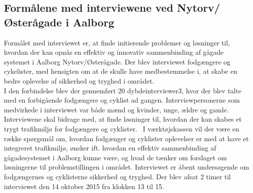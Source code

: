 \subsection{Formålene med interviewene ved Nytorv/Østerågade i Aalborg}
Formålet med interviewet er, at finde initierende problemer og løsninger til, hvordan der kan opnås en effektiv og innovativ sammenbinding af gågade systemet i Aalborg Nytorv/Østerågade. Der blev interviewet fodgængere og cykelister, med hensigten om at de skulle have medbestemmelse i, at skabe en bedre oplevelse af sikkerhed og tryghed i området.
\\
I den forbindelse blev der gennemført 20 dybdeinterviewer3, hvor der blev talte med en forbigående fodgængere og cyklist ad gangen. Interviewpersonerne som medvirkede i interviewet var både mænd og kvinder, unge, ældre og gamle. Interviewene skal bidrage med, at finde løsninger til, hvordan der kan skabes et trygt trafikmiljø for fodgængere og cyklister.
\
I værktøjskassen vil der være en række spørgsmål om, hvordan fodgænger og cyklister oplevelser er med at have et integreret trafikmiljø, ønsker ift. hvordan en effektiv sammenbinding af gågadesystemet i Aalborg kunne være, og hvad de tænker om forslaget om løsningerne til problemstillingen i området. Interviewet er åbent undersøgende om fodgængernes og cyklisterne sikkerhed og tryghed. Der blev afsat 2 timer til interviewet den 14 oktober 2015 fra klokken 13 til 15. \autocite{kvn}

